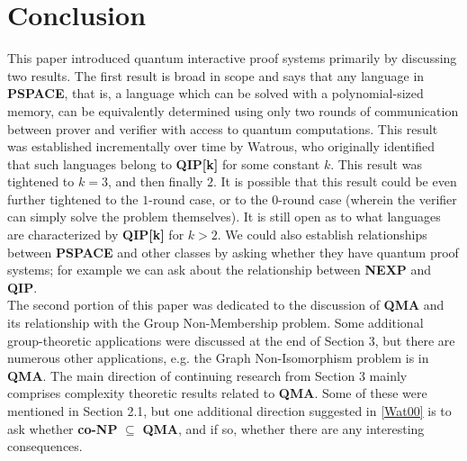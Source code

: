 \documentclass[12pt]{article}
\numberwithin{thm}{section}
\numberwithin{defn}{section}
\numberwithin{prop}{section}
\numberwithin{rmk}{section}
\begin{document}
	\section{Conclusion}
	This paper introduced quantum interactive proof systems primarily by discussing two results. The first result is broad in scope and says that any language in \textbf{PSPACE}, that is, a language which can be solved with a polynomial-sized memory, can be equivalently determined using only two rounds of communication between  prover and verifier with access to quantum computations. This result was established incrementally over time by Watrous, who originally identified that such languages belong to \textbf{QIP[k]} for some constant $k$. This result was tightened to $k=3$, and then finally $2$. It is possible that this result could be even further tightened to the $1$-round case, or to the $0$-round case (wherein the verifier can simply solve the problem themselves). It is still open as to what languages are characterized by \textbf{{QIP[k]}} for $k>2$. We could also establish relationships between \textbf{PSPACE} and other classes by asking whether they have quantum proof systems; for example we can ask about the relationship between \textbf{NEXP} and \textbf{QIP}.\\
	
	The second portion of this paper was dedicated to the discussion of \textbf{QMA} and its relationship with the Group Non-Membership problem. Some additional group-theoretic applications were discussed at the end of Section 3,  but there are numerous other applications, e.g. the Graph Non-Isomorphism problem is in \textbf{QMA}. The main direction of continuing research from Section 3 mainly comprises complexity theoretic results related to \textbf{QMA}. Some of these were mentioned in Section 2.1, but one additional direction suggested in \hyperref[wat00]{[Wat00]} is to ask whether \textbf{co-NP} $\subseteq$ \textbf{QMA}, and if so, whether there are any interesting consequences.
	
	
\end{document}

